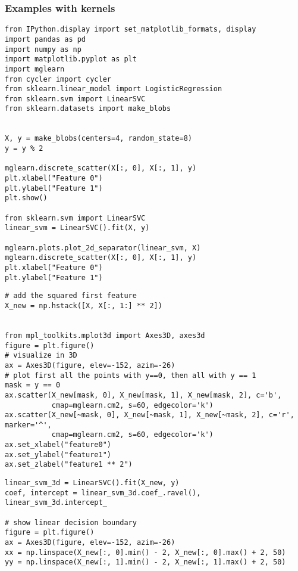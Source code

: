 \documentclass{beamer}
\begin{document}
\begin{frame}
\frametitle{Examples with kernels}

\begin{verbatim}
from IPython.display import set_matplotlib_formats, display
import pandas as pd
import numpy as np
import matplotlib.pyplot as plt
import mglearn
from cycler import cycler
from sklearn.linear_model import LogisticRegression
from sklearn.svm import LinearSVC
from sklearn.datasets import make_blobs


X, y = make_blobs(centers=4, random_state=8)
y = y % 2

mglearn.discrete_scatter(X[:, 0], X[:, 1], y)
plt.xlabel("Feature 0")
plt.ylabel("Feature 1")
plt.show()

from sklearn.svm import LinearSVC
linear_svm = LinearSVC().fit(X, y)

mglearn.plots.plot_2d_separator(linear_svm, X)
mglearn.discrete_scatter(X[:, 0], X[:, 1], y)
plt.xlabel("Feature 0")
plt.ylabel("Feature 1")
\end{verbatim}

\begin{verbatim}
# add the squared first feature
X_new = np.hstack([X, X[:, 1:] ** 2])


from mpl_toolkits.mplot3d import Axes3D, axes3d
figure = plt.figure()
# visualize in 3D
ax = Axes3D(figure, elev=-152, azim=-26)
# plot first all the points with y==0, then all with y == 1
mask = y == 0
ax.scatter(X_new[mask, 0], X_new[mask, 1], X_new[mask, 2], c='b',
           cmap=mglearn.cm2, s=60, edgecolor='k')
ax.scatter(X_new[~mask, 0], X_new[~mask, 1], X_new[~mask, 2], c='r', marker='^',
           cmap=mglearn.cm2, s=60, edgecolor='k')
ax.set_xlabel("feature0")
ax.set_ylabel("feature1")
ax.set_zlabel("feature1 ** 2")
\end{verbatim}

\begin{verbatim}
linear_svm_3d = LinearSVC().fit(X_new, y)
coef, intercept = linear_svm_3d.coef_.ravel(), linear_svm_3d.intercept_

# show linear decision boundary
figure = plt.figure()
ax = Axes3D(figure, elev=-152, azim=-26)
xx = np.linspace(X_new[:, 0].min() - 2, X_new[:, 0].max() + 2, 50)
yy = np.linspace(X_new[:, 1].min() - 2, X_new[:, 1].max() + 2, 50)


\end{verbatim}
\end{frame}
\end{document}
